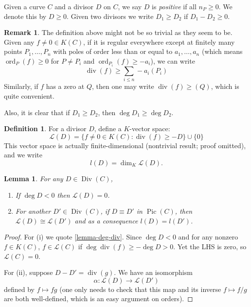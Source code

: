 \documentclass[12pt]{article}
\newtheorem{lemma}{Lemma}[subsection]
\theoremstyle{remark}
\theoremstyle{definition}
\newtheorem{remark}{Remark}[subsection]
\newtheorem{definition}{Definition}[subsection]
\newcommand{\ord}[0]{\operatorname{ord}}
\newcommand{\Div}[0]{\operatorname{Div}}
\newcommand{\pdiv}[0]{\operatorname{div}}
\newcommand{\Pic}[0]{\operatorname{Pic}}
\begin{document}
        Given a curve $C$ and a divisor $D$ on $C$, we say $D$ is \textit{positive} if all $n_P\geqslant 0$. We denote this by $D\geqslant 0$. Given two divisors we write $D_1\geqslant D_2$ if $D_1-D_2\geqslant 0$.
        \begin{remark}\label{remark-L}
            The definition above might not be so trivial as they seem to be. Given any $f\neq 0\in K(C)$, if it is regular everywhere except at finitely many points $P_1,\dots,P_n$ with poles of order less than or equal to $a_1,\dots, a_n$ (which means $\ord_P(f)\geqslant 0$ for $P\neq P_i$ and $\ord_{P_i}(f)\geqslant -a_i$), we can write
            \[\pdiv(f)\geqslant \sum_{i\leqslant n}-a_i(P_i)\]
            Similarly, if $f$ has a zero at $Q$, then one may write $\pdiv(f)\geqslant (Q)$, which is quite convenient.
            
            Also, it is clear that if $D_1\geqslant D_2$, then $\deg D_1\geqslant \deg D_2$.
        \end{remark}
        \begin{definition}
            For a divisor $D$, define a $K$-vector space:
            \[\mathcal L(D)=\{f\neq 0\in K(C):\pdiv(f)\geqslant -D\}\cup\{0\}\]
            This vector space is actually finite-dimensional (nontrivial result; proof omitted), and we write
            \[l(D)=\dim_K\mathcal L(D).\]
        \end{definition}
        \begin{lemma}\label{lemma-neg-deg}
            For any $D\in\Div(C)$,
            \begin{enumerate}[\normalfont(i)]
                \item If $\deg D<0$ then $\mathcal L(D)=0$.
                \item For another $D'\in\Div(C)$, if $D\equiv D'$ in $\Pic(C)$, then $\mathcal L(D)\cong\mathcal L(D')$ and as a consequence $l(D)=l(D')$.
            \end{enumerate}
        \end{lemma}
        \begin{proof}
             For (i) we quote \autoref{lemma-deg-div}. Since $\deg D<0$ and for any nonzero $f\in K(C)$, $f\in\mathcal L(C)$ if $\deg \pdiv(f)\geqslant -\deg D>0$. Yet the LHS is zero, so $\mathcal L(C)=0$.
             
             For (ii), suppose $D-D'=\pdiv(g)$. We have an isomorphism
             \[\alpha:\mathcal L(D)\to\mathcal L(D')\]
             defined by $f\mapsto fg$ (one only needs to check that this map and its inverse $f\mapsto f/g$ are both well-defined, which is an easy argument on orders).
        \end{proof}
\end{document}
